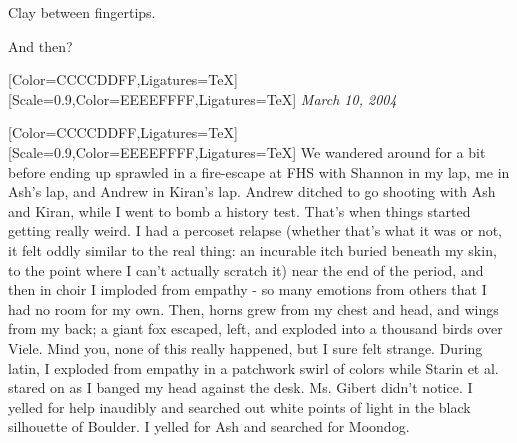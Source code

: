 \begin{paracol}{2}
\begin{leftcolumn}
\begin{ally}
Clay between fingertips.
\end{ally}
\noindent And then?
\newpage
\end{leftcolumn}
\begin{rightcolumn*}
\begin{flushright}
  [Color=CCCCDDFF,Ligatures=TeX]
  \renewfontfamily{}[Scale=0.9,Color=EEEEFFFF,Ligatures=TeX]
    \emph{March 10, 2004}
\end{flushright}
\end{rightcolumn*}
\begin{leftcolumn}
  [Color=CCCCDDFF,Ligatures=TeX]
  \renewfontfamily{}[Scale=0.9,Color=EEEEFFFF,Ligatures=TeX]
\noindent We wandered around for a bit before ending up sprawled in a fire-escape at FHS with Shannon in my lap, me in Ash's lap, and Andrew in Kiran's lap. Andrew ditched to go shooting with Ash and Kiran, while I went to bomb a history test. That's when things started getting really weird. I had a percoset relapse (whether that's what it was or not, it felt oddly similar to the real thing: an incurable itch buried beneath my skin, to the point where I can't actually scratch it) near the end of the period, and then in choir I imploded from empathy - so many emotions from others that I had no room for my own. Then, horns grew from my chest and head, and wings from my back; a giant fox escaped, left, and exploded into a thousand birds over Viele. Mind you, none of this really happened, but I sure felt strange. During latin, I exploded from empathy in a patchwork swirl of colors while Starin et al. stared on as I banged my head against the desk. Ms. Gibert didn't notice. I yelled for help inaudibly and searched out white points of light in the black silhouette of Boulder. I yelled for Ash and searched for Moondog.


\end{leftcolumn}
\end{paracol}
